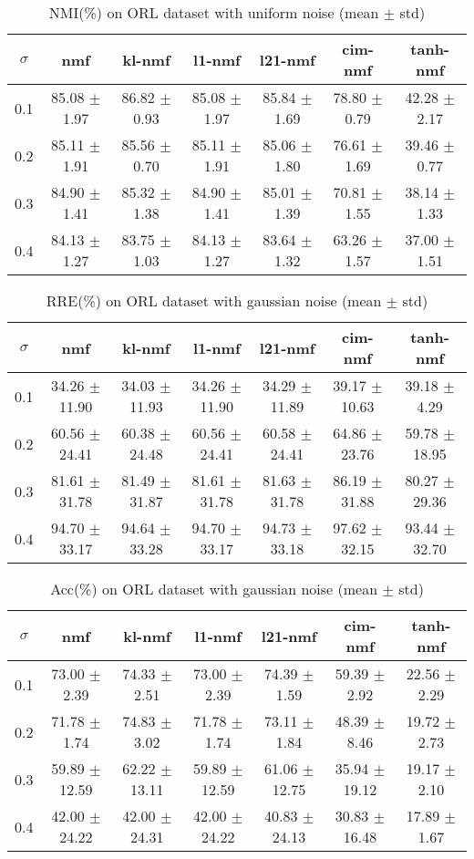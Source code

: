 \documentclass{article} %
\begin{document}
\begin{table}
\begin{tabular}{c|cccccc}$\sigma$ & nmf & kl-nmf & l1-nmf & l21-nmf & cim-nmf & tanh-nmf \\\hline
0.1 & 85.08 $\pm$ 1.97 & 86.82 $\pm$ 0.93 & 85.08 $\pm$ 1.97 & 85.84 $\pm$ 1.69 & 78.80 $\pm$ 0.79 & 42.28 $\pm$ 2.17 \\
0.2 & 85.11 $\pm$ 1.91 & 85.56 $\pm$ 0.70 & 85.11 $\pm$ 1.91 & 85.06 $\pm$ 1.80 & 76.61 $\pm$ 1.69 & 39.46 $\pm$ 0.77 \\
0.3 & 84.90 $\pm$ 1.41 & 85.32 $\pm$ 1.38 & 84.90 $\pm$ 1.41 & 85.01 $\pm$ 1.39 & 70.81 $\pm$ 1.55 & 38.14 $\pm$ 1.33 \\
0.4 & 84.13 $\pm$ 1.27 & 83.75 $\pm$ 1.03 & 84.13 $\pm$ 1.27 & 83.64 $\pm$ 1.32 & 63.26 $\pm$ 1.57 & 37.00 $\pm$ 1.51 \\
\end{tabular}\caption{
  NMI(\%) on ORL dataset with uniform noise (mean $\pm$ std)
  \label{tab:NMI-ORL-uniform}
}\end{table}
\begin{table}
\begin{tabular}{c|cccccc}$\sigma$ & nmf & kl-nmf & l1-nmf & l21-nmf & cim-nmf & tanh-nmf \\\hline
0.1 & 34.26 $\pm$ 11.90 & 34.03 $\pm$ 11.93 & 34.26 $\pm$ 11.90 & 34.29 $\pm$ 11.89 & 39.17 $\pm$ 10.63 & 39.18 $\pm$ 4.29 \\
0.2 & 60.56 $\pm$ 24.41 & 60.38 $\pm$ 24.48 & 60.56 $\pm$ 24.41 & 60.58 $\pm$ 24.41 & 64.86 $\pm$ 23.76 & 59.78 $\pm$ 18.95 \\
0.3 & 81.61 $\pm$ 31.78 & 81.49 $\pm$ 31.87 & 81.61 $\pm$ 31.78 & 81.63 $\pm$ 31.78 & 86.19 $\pm$ 31.88 & 80.27 $\pm$ 29.36 \\
0.4 & 94.70 $\pm$ 33.17 & 94.64 $\pm$ 33.28 & 94.70 $\pm$ 33.17 & 94.73 $\pm$ 33.18 & 97.62 $\pm$ 32.15 & 93.44 $\pm$ 32.70 \\
\end{tabular}\caption{
  RRE(\%) on ORL dataset with gaussian noise (mean $\pm$ std)
  \label{tab:RRE-ORL-gaussian}
}\end{table}
\begin{table}
\begin{tabular}{c|cccccc}$\sigma$ & nmf & kl-nmf & l1-nmf & l21-nmf & cim-nmf & tanh-nmf \\\hline
0.1 & 73.00 $\pm$ 2.39 & 74.33 $\pm$ 2.51 & 73.00 $\pm$ 2.39 & 74.39 $\pm$ 1.59 & 59.39 $\pm$ 2.92 & 22.56 $\pm$ 2.29 \\
0.2 & 71.78 $\pm$ 1.74 & 74.83 $\pm$ 3.02 & 71.78 $\pm$ 1.74 & 73.11 $\pm$ 1.84 & 48.39 $\pm$ 8.46 & 19.72 $\pm$ 2.73 \\
0.3 & 59.89 $\pm$ 12.59 & 62.22 $\pm$ 13.11 & 59.89 $\pm$ 12.59 & 61.06 $\pm$ 12.75 & 35.94 $\pm$ 19.12 & 19.17 $\pm$ 2.10 \\
0.4 & 42.00 $\pm$ 24.22 & 42.00 $\pm$ 24.31 & 42.00 $\pm$ 24.22 & 40.83 $\pm$ 24.13 & 30.83 $\pm$ 16.48 & 17.89 $\pm$ 1.67 \\
\end{tabular}\caption{
  Acc(\%) on ORL dataset with gaussian noise (mean $\pm$ std)
  \label{tab:Acc-ORL-gaussian}
}\end{table}
\end{document}
